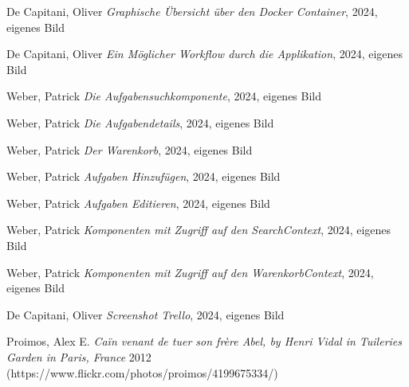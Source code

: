 \documentclass[12pt,a4paper]{scrartcl} %
\begin{document}
\renewcommand{\refname}{Quellenverzeichnis}

\begin{thebibliography}{11} 

 De Capitani, Oliver {\em Graphische Übersicht über den Docker Container}, 2024, eigenes Bild

 De Capitani, Oliver {\em Ein Möglicher Workflow durch die Applikation}, 2024, eigenes Bild

 Weber, Patrick {\em Die Aufgabensuchkomponente}, 2024, eigenes Bild

 Weber, Patrick {\em Die Aufgabendetails}, 2024, eigenes Bild

 Weber, Patrick {\em Der Warenkorb}, 2024, eigenes Bild

 Weber, Patrick {\em Aufgaben Hinzufügen}, 2024, eigenes Bild

 Weber, Patrick {\em Aufgaben Editieren}, 2024, eigenes Bild

 Weber, Patrick {\em Komponenten mit Zugriff auf den SearchContext}, 2024, eigenes Bild

 Weber, Patrick {\em Komponenten mit Zugriff auf den WarenkorbContext}, 2024, eigenes Bild

 De Capitani, Oliver {\em Screenshot Trello}, 2024, eigenes Bild

 Proimos, Alex E. {\em Caïn venant de tuer son frère Abel, by Henri Vidal in Tuileries Garden in Paris, France} 2012 (https://www.flickr.com/photos/proimos/4199675334/)



\end{thebibliography}
\end{document}
